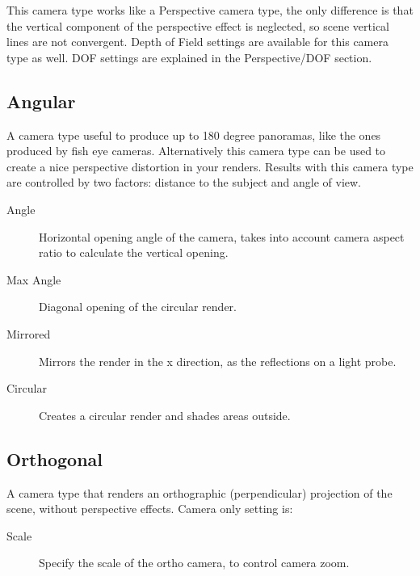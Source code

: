 This camera type works like a Perspective camera type, the only difference is that the vertical component of the perspective effect is neglected, so scene vertical lines are not convergent. Depth of Field settings are available for this camera type as well. DOF settings are explained in the Perspective/DOF section.

\subsection{Angular}

A camera type useful to produce up to 180 degree panoramas, like the ones produced by fish eye cameras. Alternatively this camera type can be used to create a nice perspective distortion in your renders. Results with this camera type are controlled by two factors: distance to the subject and angle of view.



\begin{description}
\item[Angle] Horizontal opening angle of the camera, takes into account camera aspect ratio to calculate the vertical opening.
\item[Max Angle] Diagonal opening of the circular render.
\item[Mirrored] Mirrors the render in the x direction, as the reflections on a light probe.
\item[Circular] Creates a circular render and shades areas outside.
\end{description}


\subsection{Orthogonal}

A camera type that renders an orthographic (perpendicular) projection of the scene, without perspective effects. Camera only setting is:
\begin{description}
\item[Scale] Specify the scale of the ortho camera, to control camera zoom.
\end{description}


